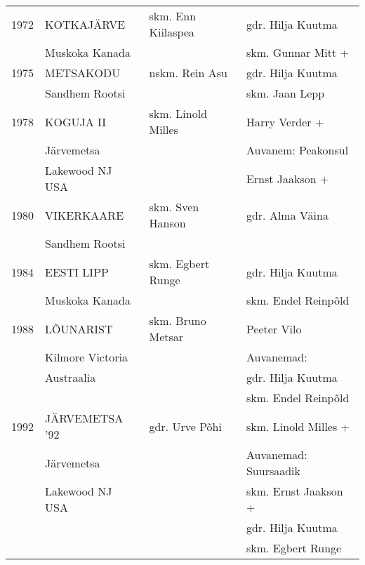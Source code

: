 \documentclass[10pt]{book}
\begin{document}
{\begin{tabular*}{1.0\textwidth}{@{\extracolsep{\fill}}@{}l@{}@{}l@{}@{}l@{}@{}l@{}}
	1972	&	KOTKAJ\"ARVE			&	skm. Enn Kiilaspea		&	gdr. Hilja Kuutma\\
			&	Muskoka Kanada			&							&	skm. Gunnar Mitt +\\[2mm]
	1975	&	METSAKODU				&	nskm. Rein Asu			&	gdr. Hilja Kuutma\\
			&	Sandhem Rootsi			&							&	skm. Jaan Lepp\\[2mm]
	1978	&	KOGUJA II				&	skm. Linold Milles		&	Harry Verder +\\
			&	J\"arvemetsa			&							&	Auvanem: Peakonsul\\
			&	Lakewood NJ USA			&							&	Ernst Jaakson +\\[2mm]
	1980	&	VIKERKAARE				&	skm. Sven Hanson		&	gdr. Alma V\"aina\\
			&	Sandhem Rootsi			&							&	\\[2mm]
	1984	&	EESTI LIPP				&	skm. Egbert Runge		&	gdr. Hilja Kuutma\\
			&	Muskoka Kanada			&							&	skm. Endel Reinp\~old\\[2mm]
	1988	&	L\~OUNARIST				&	skm. Bruno Metsar		&	Peeter Vilo\\
			&	Kilmore Victoria		&							&	Auvanemad:\\
			&	Austraalia				&							&	gdr. Hilja Kuutma\\
			&							&							&	skm. Endel Reinp\~old	\\[2mm]
	1992	&	J\"ARVEMETSA '92		&	gdr. Urve P\~ohi		&	skm. Linold Milles +\\
			&	J\"arvemetsa			&							&	Auvanemad: Suursaadik\\
			&	Lakewood NJ USA			&							&	skm. Ernst Jaakson +\\
			&							&							&	gdr. Hilja Kuutma\\
			&							&							&	skm. Egbert Runge\\[2mm]
\end{tabular*}}
\end{document}
